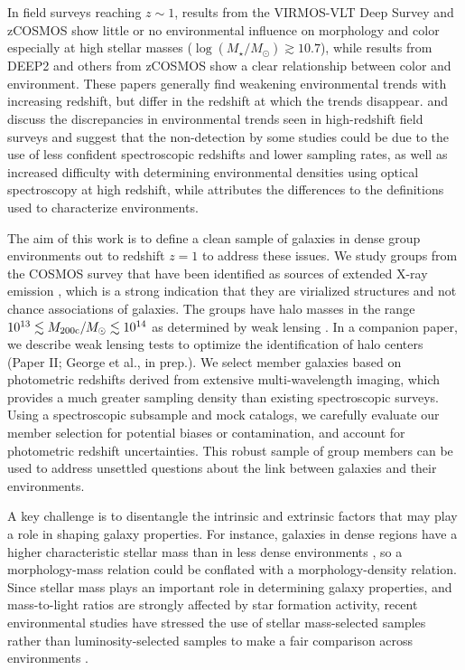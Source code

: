 In field surveys reaching $z\sim1$, results from
the VIRMOS-VLT Deep Survey \citep[VVDS;][]{Scodeggio2009} and zCOSMOS
\citep{Tasca2009,  Cucciati2010, Iovino2010, Kovac2010b} show little or
no environmental influence on morphology and color especially at high
stellar masses ($\log(M_{\star}/M_{\odot})\gtrsim10.7$), while results
from DEEP2 \citep{Cooper2010} and others from zCOSMOS \citep{Peng2010}
show a clear relationship between color and environment. These papers
generally find weakening environmental trends with increasing
redshift, but differ in the redshift at which the trends
disappear. \citet{Cooper2007} and \citet{Cooper2010} discuss the discrepancies in
environmental trends seen in high-redshift field surveys and suggest
that the non-detection by some studies could be due to
the use of less confident spectroscopic redshifts and lower sampling rates, as
well as increased difficulty with determining environmental densities
using optical spectroscopy at high redshift, while \citet{Peng2010}
attributes the differences to the definitions used to characterize
environments.

The aim of this work is to define a clean sample of galaxies in dense
group environments out to redshift $z=1$ to address these issues. We study groups from the
COSMOS survey that have been identified as sources of extended X-ray
emission \citep[][and in prep.]{Finoguenov2007}, which is a strong
indication that they are virialized structures and not chance
associations of galaxies. The groups have halo masses in the range
$10^{13} \lesssim M_{200\rm{c}}/M_{\odot} \lesssim 10^{14}$ as
determined by weak lensing \citep{Leauthaud2010}.  In a companion
paper, we describe weak lensing tests to optimize the identification
of halo centers (Paper II; George et al., in prep.). We select member
galaxies based on photometric redshifts derived from
extensive multi-wavelength imaging, which provides a
much greater sampling density than existing spectroscopic
surveys. Using a spectroscopic subsample and mock catalogs, we
carefully evaluate our member selection for potential biases or
contamination, and account for photometric redshift
uncertainties. This robust sample of group members can be used to
address unsettled questions about the link between galaxies and their
environments.

A key challenge is to disentangle the intrinsic and extrinsic factors
that may play a role in shaping galaxy properties. For instance, galaxies
in dense regions have a higher characteristic stellar mass than in
less dense environments \citep[e.g.,][]{Baldry2006}, so a
morphology-mass relation could be conflated with a morphology-density
relation. Since stellar mass plays an important role in determining
galaxy properties, and mass-to-light ratios are strongly affected by
star formation activity, recent environmental studies have stressed
the use of stellar mass-selected samples rather than
luminosity-selected samples to make a fair comparison across
environments \citep[e.g.,][]{VanDerWel2007, Scodeggio2009,
  Cooper2010}.


